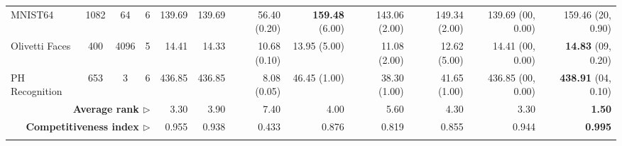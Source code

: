 \documentclass[10pt]{article} %
\newcommand{\bestcell}[1]{\cellcolor{gray!30}\textbf{#1}}
\newcommand{\hyperp}[1]{\tiny{\tiny(#1)}}
\begin{document}
\begin{table}[t]
\begin{adjustbox}{width=\linewidth,center}
\begin{tabular}{lccc|rrrrrr|rr}
MNIST64 & 1082 & 64 & 6 & 139.69 & 139.69 & 56.40 \hyperp{0.20} & \bestcell{159.48} \hyperp{6.00} & 143.06 \hyperp{2.00} & 149.34 \hyperp{2.00} & 139.69 \hyperp{00, 0.00} & 159.46 \hyperp{20, 0.90} \\
Olivetti Faces & 400 & 4096 & 5 & 14.41 & 14.33 & 10.68 \hyperp{0.10} & 13.95 \hyperp{5.00} & 11.08 \hyperp{2.00} & 12.62 \hyperp{5.00} & 14.41 \hyperp{00, 0.00} & \bestcell{14.83} \hyperp{09, 0.20} \\
PH Recognition & 653 & 3 & 6 & 436.85 & 436.85 & 8.08 \hyperp{0.05} & 46.45 \hyperp{1.00} & 38.30 \hyperp{1.00} & 41.65 \hyperp{1.00} & 436.85 \hyperp{00, 0.00} & \bestcell{438.91} \hyperp{04, 0.10} \\
\hline
\hline
\multicolumn{4}{r|}{\textbf{Average rank $\rhd$}} & 3.30 & 3.90 & 7.40 & 4.00 & 5.60 & 4.30 & 3.30 & \bestcell{1.50} \\
\multicolumn{4}{r|}{\textbf{Competitiveness index $\rhd$}} & 0.955 & 0.938 & 0.433 & 0.876 & 0.819 & 0.855 & 0.944 & \bestcell{0.995} \\
\Xhline{1pt}
\end{tabular}
\end{adjustbox}
%
\end{table}
\end{document}
